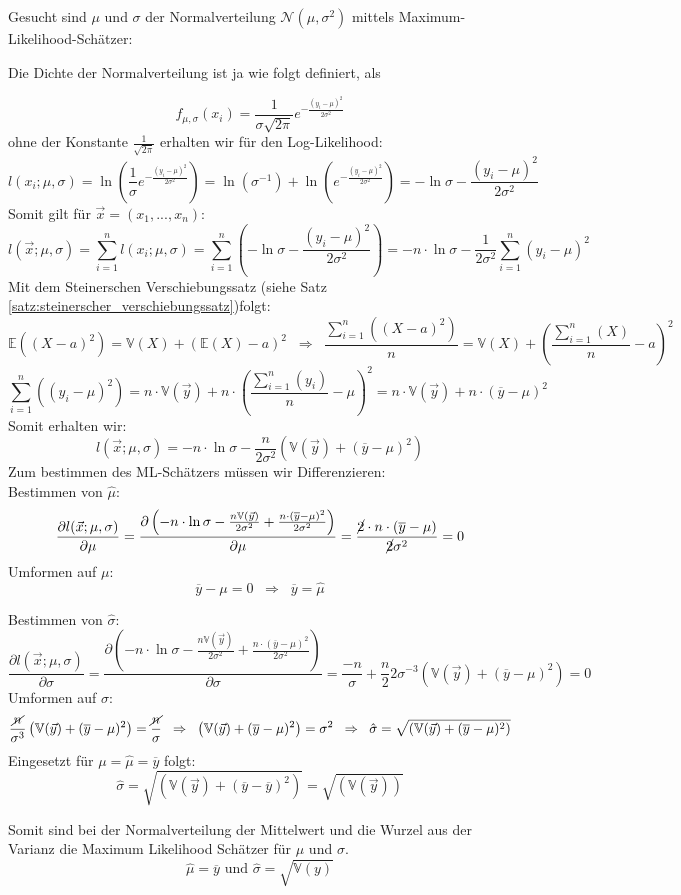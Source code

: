 \begin{bsp}\label{bsp:ml_normalverteilung}
    Gesucht sind $\mu$ und $\sigma$ der Normalverteilung $\mathcal N(\mu, \sigma^2)$ mittels Maximum-Likelihood-Schätzer: 

    Die Dichte der Normalverteilung ist ja wie folgt definiert, als 
    
    \[f_{\mu,\sigma}(x_i)=\frac{1}{\sigma\sqrt{2\pi}}e^{-\frac{(y_i-\mu)^2}{2\sigma^2}}\]
    ohne der Konstante $\frac{1}{\sqrt{2\pi}}$ erhalten wir für den Log-Likelihood:
    \[l(x_i;\mu, \sigma)=\ln\left(\frac{1}{\sigma}e^{-\frac{(y_i-\mu)^2}{2\sigma^2}}\right)=
    \ln\left(\sigma^{-1}\right)+\ln\left(e^{-\frac{(y_i-\mu)^2}{2\sigma^2}}\right)=
    -\ln\sigma-\frac{(y_i-\mu)^2}{2\sigma^2}\]
    Somit gilt für $\vec x=(x_1, ..., x_n)$:
    \[l(\vec x;\mu, \sigma)=\sum_{i=1}^nl(x_i;\mu,\sigma)=
    \sum_{i=1}^n\left(-\ln\sigma-\frac{(y_i-\mu)^2}{2\sigma^2}\right)=
    -n\cdot \ln\sigma-\frac{1}{2\sigma^2}\sum_{i=1}^n(y_i-\mu)^2
    \]
    Mit dem Steinerschen Verschiebungssatz (siehe Satz \ref{satz:steinerscher_verschiebungssatz})folgt:
    \[\mathbb E((X-a)^2)=\mathbb V(X)+(\mathbb E(X)-a)^2\;\;\Rightarrow\;\;\frac{\sum_{i=1}^n((X-a)^2)}{n}=\mathbb V(X)+(\frac{\sum_{i=1}^n(X)}{n}-a)^2\]
    \[{\sum_{i=1}^n((y_i-\mu)^2)}=n\cdot\mathbb V(\vec y)+n\cdot(\frac{\sum_{i=1}^n(y_i)}{n}-\mu)^2=
    n\cdot\mathbb V(\vec y)+n\cdot(\overline y-\mu)^2
    \]
    Somit erhalten wir: 
    \[l(\vec x;\mu, \sigma)=
    -n\cdot \ln\sigma-\frac{n}{2\sigma^2}\left(\mathbb V(\vec y)+(\overline y-\mu)^2\right)
    \]
    Zum bestimmen des ML-Schätzers müssen wir Differenzieren:\\
    Bestimmen von $\hat\mu$:
    \[\frac{\partial l(\vec x;\mu, \sigma)}{\partial \mu}=
    \frac{\partial \left(-n\cdot \ln\sigma-\frac{n\mathbb{V}(\vec y)}{2\sigma^2}+\frac{n\cdot(\overline y-\mu)^2}{2\sigma^2}\right)}{\partial \mu}=
    \frac{\cancel2\cdot n\cdot(\overline y-\mu)}{\cancel 2\sigma^2}=0
    \]
    Umformen auf $\mu$:
    \[\overline y-\mu=0\;\;\Rightarrow\;\;\overline y=\hat\mu\]

    Bestimmen von $\hat\sigma$:
    \[\frac{\partial l(\vec x;\mu, \sigma)}{\partial \sigma}=
    \frac{\partial \left(-n\cdot \ln\sigma-\frac{n\mathbb{V}(\vec y)}{2\sigma^2}+\frac{n\cdot(\overline y-\mu)^2}{2\sigma^2}\right)}{\partial \sigma}=\frac{-n}{\sigma}+\frac{n}{2}2\sigma^{-3}\left(\mathbb V(\vec y)+(\overline y-\mu)^2\right)
    =0\]
    Umformen auf $\sigma$:
    \[\frac{\cancel n}{\sigma^3}\left(\mathbb V(\vec y)+(\overline y-\mu)^2\right)
    =\frac{\cancel n}{\sigma}\;\;\Rightarrow\;\;
    \left(\mathbb V(\vec y)+(\overline y-\mu)^2\right)
    =\sigma^2\;\;\Rightarrow\;\;
    \hat\sigma=\sqrt{\left(\mathbb V(\vec y)+(\overline y-\mu)^2\right)}\]
    Eingesetzt für $\mu=\hat\mu=\overline y$ folgt:
    \[
    \hat\sigma=\sqrt{\left(\mathbb V(\vec y)+(\overline y-\overline y)^2\right)}=\sqrt{\left(\mathbb V(\vec y)\right)}\]

    Somit sind bei der Normalverteilung der Mittelwert und die Wurzel aus der Varianz die Maximum Likelihood Schätzer für $\mu$ und $\sigma$.
    \[\hat \mu=\overline y\text{ und }\hat \sigma=\sqrt{\mathbb{V}(y)}\]
\end{bsp}


